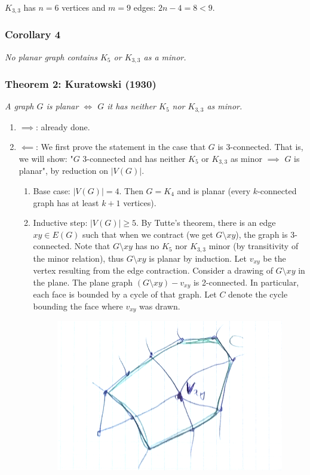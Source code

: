 		$K_{3,3}$ has $n = 6$ vertices and $m = 9$ edges: $2n - 4 = 8 < 9$.
		
		\subsubsection{Corollary 4}
		\textit{No planar graph contains $K_5$ or $K_{3,3}$ as a minor.}
		
		\subsubsection{Theorem 2: Kuratowski (1930)}
		\textit{A graph $G$ is planar $\iff$ $G$ it has neither $K_5$ nor $K_{3,3}$ as minor.\\}
		
		\begin{enumerate}
			\item $\implies$: already done.
			\item $\impliedby$: We first prove the statement in the case that $G$ is 3-connected. That is, we will show: "$G$ 3-connected and has neither $K_5$ or $K_{3,3}$ as minor $\implies$ $G$ is planar", by reduction on $|V(G)|$.
				\begin{enumerate}
					\item Base case: $|V(G)| = 4$. Then $G = K_4$ and is planar (every $k$-connected graph has at least $k+1$ vertices).
					\item Inductive step: $|V(G)| \geq 5$. By Tutte's theorem, there is an edge $xy \in E(G)$ such that when we contract (we get $G \setminus xy$), the graph is 3-connected. Note that $G \setminus xy$ has no $K_5$ nor $K_{3,3}$ minor (by transitivity of the minor relation), thus $G \setminus xy$ is planar by induction. Let $v_{xy}$ be the vertex resulting from the edge contraction. Consider a drawing of $G \setminus xy$ in the plane. The plane graph $(G \setminus xy) - v_{xy}$ is 2-connected. In particular, each face is bounded by a cycle of that graph. Let $C$ denote the cycle bounding the face where $v_{xy}$ was drawn.
\begin{figure}[h]
	\center
	\includegraphics[width=0.3\linewidth]{img/4-1.png}
\end{figure}


\end{enumerate}
\end{enumerate}

